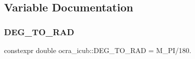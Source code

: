 \subsection{Variable Documentation}
\hypertarget{namespaceocra__icub_ab06477ded34ed5514b911a3511b22e3d}{}\label{namespaceocra__icub_ab06477ded34ed5514b911a3511b22e3d} 
\subsubsection{\texorpdfstring{D\+E\+G\+\_\+\+T\+O\+\_\+\+R\+AD}{DEG\_TO\_RAD}}
{\footnotesize\ttfamily constexpr double ocra\+\_\+icub\+::\+D\+E\+G\+\_\+\+T\+O\+\_\+\+R\+AD = M\+\_\+\+PI/180.\hspace{0.3cm}{\ttfamily [static]}}


